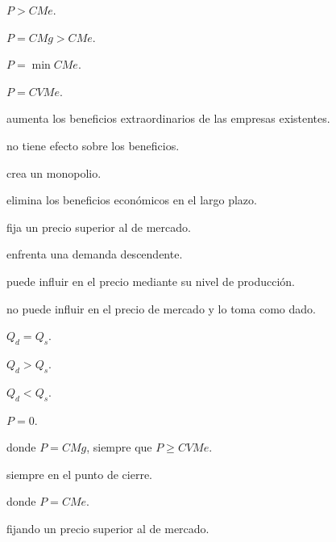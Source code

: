 \begin{opts}
    \item $P>CMe$.
    \item $P=CMg>CMe$.
    \item $P=\min CMe$.
    \item $P=CVMe$.
\end{opts}

\begin{opts}
    \item aumenta los beneficios extraordinarios de las empresas existentes.
    \item no tiene efecto sobre los beneficios.
    \item crea un monopolio.
    \item elimina los beneficios económicos en el largo plazo.
\end{opts}

\begin{opts}
    \item fija un precio superior al de mercado.
    \item enfrenta una demanda descendente.
    \item puede influir en el precio mediante su nivel de producción.
    \item no puede influir en el precio de mercado y lo toma como dado.
\end{opts}

\begin{opts}
    \item $Q_d=Q_s$.
    \item $Q_d>Q_s$.
    \item $Q_d<Q_s$.
    \item $P=0$.
\end{opts}

\begin{opts}
    \item donde $P=CMg$, siempre que $P\geq CVMe$.
    \item siempre en el punto de cierre.
    \item donde $P=CMe$.
    \item fijando un precio superior al de mercado.
\end{opts}
